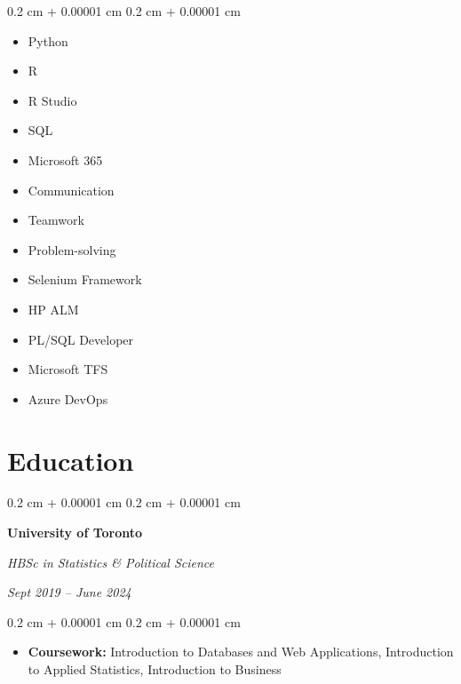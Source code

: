 \documentclass[10pt, letterpaper]{article}
\newenvironment{highlights}{
    \begin{itemize}[
        topsep=0.10 cm,
        parsep=0.10 cm,
        partopsep=0pt,
        itemsep=0pt,
        leftmargin=0.4 cm + 10pt
    ]
}{
    \end{itemize}
} %
\newenvironment{highlightsforbulletentries}{
    \begin{itemize}[
        topsep=0.10 cm,
        parsep=0.10 cm,
        partopsep=0pt,
        itemsep=0pt,
        leftmargin=10pt
    ]
}{
    \end{itemize}
} %
\newenvironment{onecolentry}{
    \begin{adjustwidth}{
        0.2 cm + 0.00001 cm
    }{
        0.2 cm + 0.00001 cm
    }
}{
    \end{adjustwidth}
} %
\newenvironment{twocolentry}[2][]{
    \onecolentry
    \def\secondColumn{#2}
    \setcolumnwidth{\fill, 4.5 cm}
    \begin{paracol}{2}
}{
    \switchcolumn \raggedleft \secondColumn
    \end{paracol}
    \endonecolentry
} %
\begin{document}
    \begin{onecolentry}
        \begin{highlightsforbulletentries}


        \item Python

        \item R

        \item R Studio

        \item SQL

        \item Microsoft 365

        \item Communication

        \item Teamwork

        \item Problem-solving

        \item Selenium Framework

        \item HP ALM

        \item PL/SQL Developer

        \item Microsoft TFS

        \item Azure DevOps


        \end{highlightsforbulletentries}
    \end{onecolentry}

    \section{Education}



        
        \begin{twocolentry}{
            
            
        \textit{Sept 2019 – June 2024}}
            \textbf{University of Toronto}

            \textit{HBSc in Statistics \& Political Science}
        \end{twocolentry}

        \vspace{0.10 cm}
        \begin{onecolentry}
            \begin{highlights}
                \item \textbf{Coursework:} Introduction to Databases and Web Applications, Introduction to Applied Statistics, Introduction to Business
            \end{highlights}
        \end{onecolentry}
\end{document}
